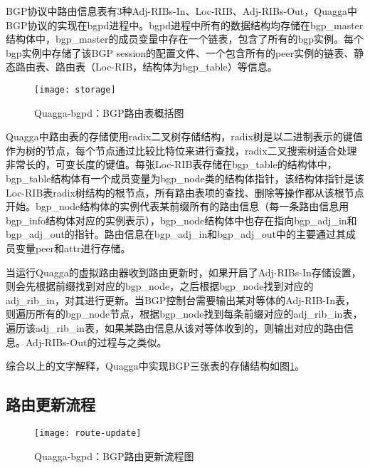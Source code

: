 BGP协议中路由信息表有3种Adj-RIBs-In、Loc-RIB、Adj-RIBs-Out，Quagga中BGP协议的实现在bgpd进程中。bgpd进程中所有的数据结构均存储在bgp\_master结构体中，bgp\_master的成员变量中存在一个链表，包含了所有的bgp实例。每个bgp实例中存储了该BGP session的配置文件、一个包含所有的peer实例的链表、静态路由表、路由表（Loc-RIB，结构体为bgp\_table）等信息。


\begin{figure}
  \centering
  \texttt{[image: storage]}
  \caption{Quagga-bgpd：BGP路由表概括图\cite{jakma2014quagga}}
  \label{fig:storage}
\end{figure}

Quagga中路由表的存储使用radix二叉树\cite{quaggaThesis}存储结构，radix树是以二进制表示的键值作为树的节点，每个节点通过比较比特位来进行查找，radix二叉搜索树适合处理非常长的，可变长度的键值。每张Loc-RIB表存储在bgp\_table的结构体中，bgp\_table结构体有一个成员变量为bgp\_node类的结构体指针，该结构体指针是该Loc-RIB表radix树结构的根节点，所有路由表项的查找、删除等操作都从该根节点开始。bgp\_node结构体的实例代表某前缀所有的路由信息（每一条路由信息用bgp\_info结构体对应的实例表示），bgp\_node结构体中也存在指向bgp\_adj\_in和bgp\_adj\_out的指针。路由信息在bgp\_adj\_in和bgp\_adj\_out中的主要通过其成员变量peer和attr进行存储。

当运行Quagga的虚拟路由器收到路由更新时，如果开启了Adj-RIBs-In存储设置，则会先根据前缀找到对应的bgp\_node，之后根据bgp\_node找到对应的adj\_rib\_in，对其进行更新。当BGP控制台需要输出某对等体的Adj-RIB-In表，则遍历所有的bgp\_node节点，根据bgp\_node找到每条前缀对应的adj\_rib\_in表，遍历该adj\_rib\_in表，如果某路由信息从该对等体收到的，则输出对应的路由信息。Adj-RIBs-Out的过程与之类似。

综合以上的文字解释，Quagga中实现BGP三张表的存储结构如图\ref{fig:storage}。


\subsection{路由更新流程}

\begin{figure}
  \centering
  \texttt{[image: route-update]}
  \caption{Quagga-bgpd：BGP路由更新流程图}
  \label{fig:route-update}
\end{figure}



